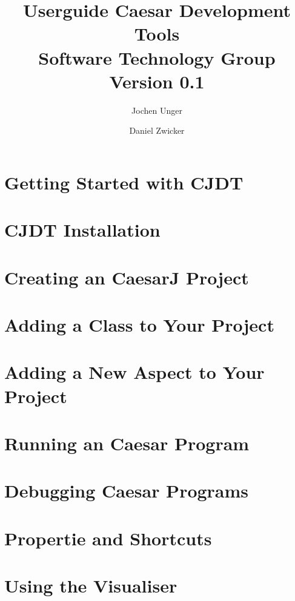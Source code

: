 \documentclass[a4paper,12pt,twoside,titlepage]{article}
\title{\textbf{Userguide Caesar Development Tools}\\\small{Software Technology Group}\\\small{Version 0.1}}
\author{Jochen Unger\and Daniel Zwicker}
\begin{document}
\maketitle
\tableofcontents

\newpage
\section{Getting Started with CJDT}


\newpage
\section{CJDT Installation}


\newpage
\section{Creating an CaesarJ Project}


\newpage
\section{Adding a Class to Your Project}


\newpage
\section{Adding a New Aspect to Your Project}


\newpage
\section{Running an Caesar Program}


\newpage
\section{Debugging Caesar Programs}


\newpage
\section{Propertie and Shortcuts}


\newpage
\section{Using the Visualiser}

\end{document}

